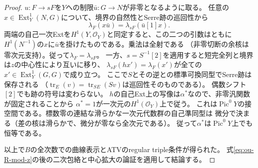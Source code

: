 \documentclass[11pt,a4paper]{ltjsarticle}
\theoremstyle{definition}
\newcommand{\Pic}{\operatorname{Pic}}
\begin{document}
\begin{proof}
$u:F\to sF$を$Y$への制限$\bar u:G\to N$が非零となるように取る。
任意の$x\in\operatorname{Ext}^1_Y(N,G)$について、境界の自然性とSerre跡の巡回性から
\[
 \lambda_F(x\bar u)=\lambda_{sF}(\bar u[1]x).
\]
両端の自己一次Extを$H^1(Y,\mathcal O_Y)$と同定すると、この二つの引数はともに
$H^1(N^{-1})$の$x$に$\bar u$を掛けたものである。乗法は全射である
（非零切断の余核は零次元支持）。従って$\lambda_F=\lambda_{sF}$。
一方、$s=S^{-1}[2]$を適用すると短完全列と境界は$z$の中心性により互いに移り、
$\lambda_{sF}(h x')=\lambda_F(x')$が全ての$x'\in\operatorname{Ext}^1_Y(G,G)$で成り立つ。
ここで$S$とその逆との標準可換同型でSerre跡は保存される
（$\operatorname{tr}_E(v)=\operatorname{tr}_{SE}(Sv)$は巡回性そのものである）。
偶数シフト$[2]$でも跡の符号は変わらない。
$h$の自己Ext上の写像は$\alpha^*$なので、非零汎関数が固定されることから
$\alpha^*=1$が一次元の$H^1(\mathcal O_Y)$上で従う。
これは$\Pic^0Y$の接空間である。標数零の連結な滑らかな一次元代数群の自己準同型は
微分で決まる（差の核は滑らかで、微分が零なら全次元である）。
従って$\alpha^*$は$\Pic^0Y$上でも恒等である。

以上で$B$の全次数での曲線表示とATVのregular triple条件が得られた。
式\eqref{eq:ou-R-mod-z}の後の二次包絡と中心拡大の論証を適用して結論する。
\end{proof}
\end{document}
